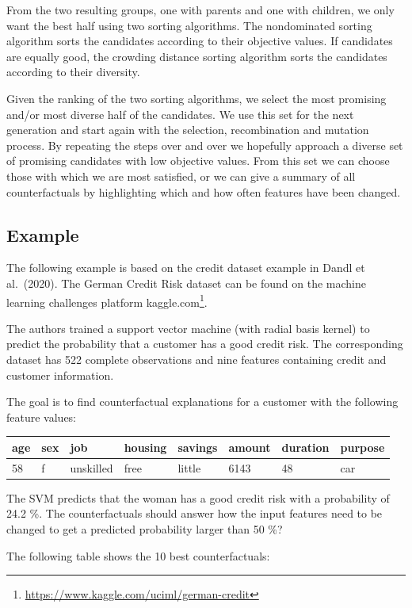 \documentclass[
  12pt,
]{krantz}
\renewcommand{\href}[2]{#2\footnote{\url{#1}}}
\begin{document}
From the two resulting groups, one with parents and one with children, we only want the best half using two sorting algorithms.
The nondominated sorting algorithm sorts the candidates according to their objective values.
If candidates are equally good, the crowding distance sorting algorithm sorts the candidates according to their diversity.

Given the ranking of the two sorting algorithms, we select the most promising and/or most diverse half of the candidates.
We use this set for the next generation and start again with the selection, recombination and mutation process.
By repeating the steps over and over we hopefully approach a diverse set of promising candidates with low objective values.
From this set we can choose those with which we are most satisfied, or we can give a summary of all counterfactuals by highlighting which and how often features have been changed.

\hypertarget{example-8}{%
\subsection{Example}\label{example-8}}

The following example is based on the credit dataset example in Dandl et al.~(2020).
The German Credit Risk dataset can be found on the machine learning challenges platform \href{https://www.kaggle.com/uciml/german-credit}{kaggle.com}.

The authors trained a support vector machine (with radial basis kernel) to predict the probability that a customer has a good credit risk.
The corresponding dataset has 522 complete observations and nine features containing credit and customer information.

The goal is to find counterfactual explanations for a customer with the following feature values:

\begin{longtable}[]{@{}llllllll@{}}
\toprule
age & sex & job & housing & savings & amount & duration & purpose\tabularnewline
\midrule
\endhead
58 & f & unskilled & free & little & 6143 & 48 & car\tabularnewline
\bottomrule
\end{longtable}

The SVM predicts that the woman has a good credit risk with a probability of 24.2 \%.
The counterfactuals should answer how the input features need to be changed to get a predicted probability larger than 50 \%?

The following table shows the 10 best counterfactuals:
\end{document}

